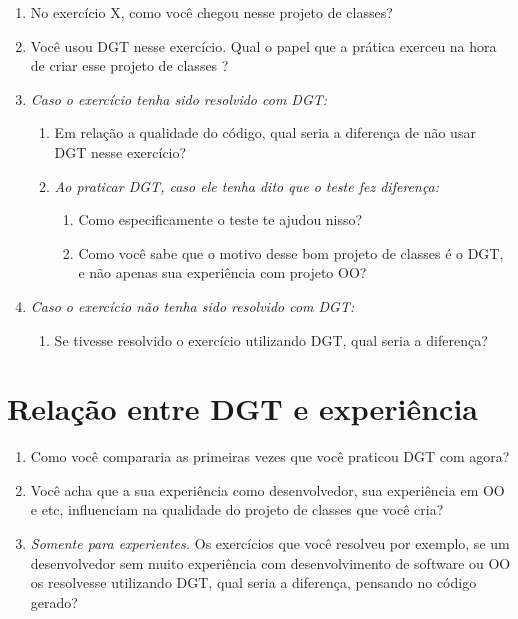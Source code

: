 \begin{enumerate}
	
	\item No exercício X, como você chegou nesse projeto de classes? 

	\item Você usou DGT nesse exercício. Qual o papel que a prática exerceu na hora de criar esse projeto de classes ?

	\item \textit{Caso o exercício tenha sido resolvido com DGT:}
		\begin{enumerate}
			\item Em relação a qualidade do código, qual seria a diferença de não usar DGT nesse exercício?
		
			\item \textit{Ao praticar DGT, caso ele tenha dito que o teste fez diferença:}
				\begin{enumerate}
					\item Como especificamente o teste te ajudou nisso?
	
					\item Como você sabe que o motivo desse bom projeto de classes é o DGT, e não apenas sua experiência
					com projeto OO?
				\end{enumerate}
		\end{enumerate}
		
	\item \textit{Caso o exercício não tenha sido resolvido com DGT:}
		\begin{enumerate}
			\item Se tivesse resolvido o exercício utilizando DGT, qual seria a diferença?
		\end{enumerate}

\end{enumerate}

\section{Relação entre DGT e experiência}

\begin{enumerate}
	\item Como você compararia as primeiras vezes que você praticou DGT com agora?

	\item Você acha que a sua experiência como desenvolvedor, sua experiência em OO e etc,
	influenciam na qualidade do projeto de classes que você cria?

	\item \textit{Somente para experientes.} Os exercícios que você resolveu por exemplo, se um desenvolvedor
	sem muito experiência com desenvolvimento de software ou OO os resolvesse utilizando DGT, qual seria a diferença,
	pensando no código gerado?

\end{enumerate}

